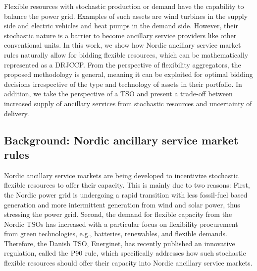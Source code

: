 \documentclass[conference]{IEEEtran}
\begin{document}
Flexible resources with stochastic production or demand have the capability to balance the power grid. Examples of such assets are  wind turbines in the supply side and electric vehicles and heat pumps in the demand side. However, their stochastic nature is a barrier to become ancillary service providers like other conventional units. In this work, we show how Nordic ancillary service market rules naturally allow for bidding flexible resources, which can be mathematically represented as a \ac{DRJCCP}. From the  perspective of flexibility aggregators, the proposed methodology is general, meaning it can be exploited for optimal bidding decisions irrespective of the type and technology of  assets in their portfolio. %
In addition, we take the perspective of a \ac{TSO} and present a trade-off between increased  supply of ancillary services from stochastic resources and uncertainty of delivery. 


\vspace{2mm}
\subsection{Background: Nordic ancillary service market rules}\label{sec:background}
\vspace{-1mm}
Nordic ancillary service markets are being developed to incentivize stochastic flexible resources to offer their capacity. This is mainly due to two reasons: First, the Nordic power grid is undergoing a rapid transition with less fossil-fuel based generation and more intermittent generation from wind and solar power, thus stressing the power grid. Second, the demand for flexible capacity from the Nordic \acp{TSO} has increased with a particular focus on flexibility procurement from green technologies, e.g., batteries, renewables, and flexible demands. Therefore, the Danish \ac{TSO}, Energinet, has recently published an innovative regulation, called the $\rm{P90}$ rule, which specifically addresses how such stochastic flexible resources should offer their capacity into Nordic ancillary service markets.
\end{document}
